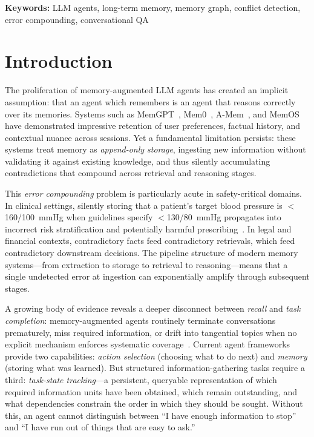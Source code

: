 \documentclass[10pt,twocolumn]{article}
\begin{document}
\noindent\textbf{Keywords:} LLM agents, long-term memory, memory graph,
conflict detection, error compounding, conversational QA

\section{Introduction}
\label{sec:intro}

The proliferation of memory-augmented LLM agents has created an implicit
assumption: that an agent which remembers is an agent that reasons correctly
over its memories. Systems such as MemGPT~\citep{packer2023memgpt},
Mem0~\citep{chhikara2025mem0}, A-Mem~\citep{xu2025mem}, and
MemOS~\citep{li2025memos} have demonstrated impressive retention of user
preferences, factual history, and contextual nuance across sessions. Yet a
fundamental limitation persists: these systems treat memory as
\emph{append-only storage}, ingesting new information without validating it
against existing knowledge, and thus silently accumulating contradictions
that compound across retrieval and reasoning stages.

This \emph{error compounding} problem is particularly acute in
safety-critical domains. In clinical settings, silently storing that a
patient's target blood pressure is $<$160/100~mmHg when guidelines specify
$<$130/80~mmHg propagates into incorrect risk stratification and potentially
harmful prescribing~\citep{yaraghi2024generative}. In legal and financial
contexts, contradictory facts feed contradictory retrievals, which feed
contradictory downstream decisions. The pipeline structure of modern memory
systems---from extraction to storage to retrieval to
reasoning---means that a single undetected error at ingestion can
exponentially amplify through subsequent stages.

A growing body of evidence reveals a deeper disconnect between \emph{recall}
and \emph{task completion}: memory-augmented agents routinely terminate
conversations prematurely, miss required information, or drift into tangential
topics when no explicit mechanism enforces systematic
coverage~\citep{xi2025rise, wang2024survey}. Current agent
frameworks provide two capabilities: \emph{action selection} (choosing what
to do next) and \emph{memory} (storing what was learned). But structured
information-gathering tasks require a third: \emph{task-state tracking}---a
persistent, queryable representation of which required information units have
been obtained, which remain outstanding, and what dependencies constrain the
order in which they should be sought. Without this, an agent cannot
distinguish between ``I have enough information to stop'' and ``I have run
out of things that are easy to ask.''
\end{document}

